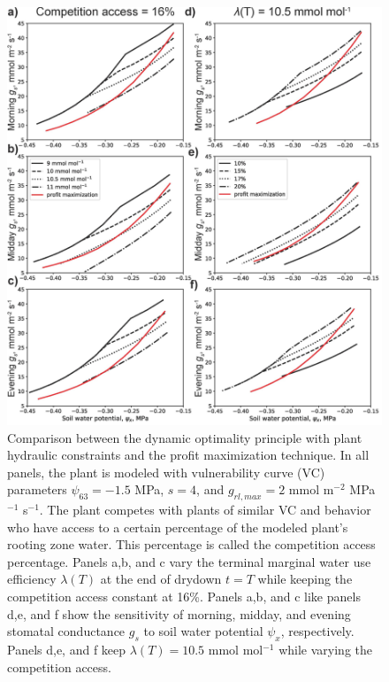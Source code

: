 \documentclass[utf8]{frontiersSCNS} %
\begin{document}
\begin{figure}[h]
    \begin{center}
         \includegraphics[scale=0.75]{profit_compare.jpg}   
    \end{center}
    \caption{Comparison between the dynamic optimality principle with plant hydraulic constraints and the profit maximization technique. In all panels, the plant is modeled with vulnerability curve (VC) parameters $\psi_{63} = -1.5$ MPa, $s=4$, and $g_{rl,max} = 2$ mmol m$^{-2}$ MPa$^{-1}$ s$^{-1}$. The plant competes with plants of similar VC and behavior who have access to a certain percentage of the modeled plant's rooting zone water. This percentage is called the competition access percentage. Panels a,b, and c vary the terminal marginal water use efficiency $\lambda(T)$ at the end of drydown $t=T$ while keeping the competition access constant at 16\%. Panels a,b, and c like panels d,e, and f show the sensitivity of morning, midday, and evening  stomatal conductance $g_s$ to soil water potential $\psi_x$, respectively. Panels d,e, and f keep $\lambda(T) = 10.5$ mmol mol$^{-1}$ while varying the competition access.} 
    \label{fig:profit_compare}
\end{figure}
\end{document}
